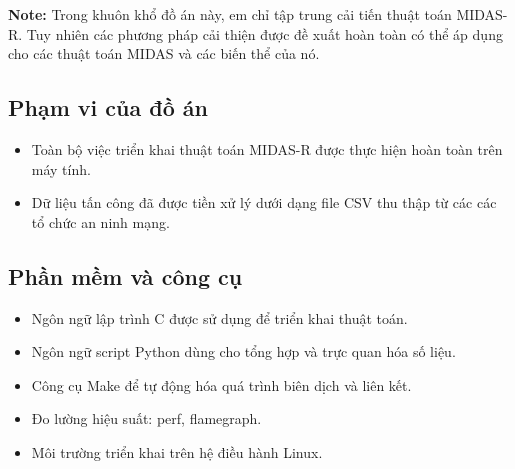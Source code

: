 \begin{tcolorbox}
    \textbf{Note:} Trong khuôn khổ đồ án này, em chỉ tập trung cải tiến thuật toán MIDAS-R.
    Tuy nhiên các phương pháp cải thiện được đề xuất hoàn toàn có thể áp dụng cho các thuật toán MIDAS
    và các biến thể của nó.
\end{tcolorbox}

\subsection{Phạm vi của đồ án}
\begin{itemize}
    \item  Toàn bộ việc triển khai thuật toán MIDAS-R được thực hiện hoàn toàn trên máy tính.
    \item Dữ liệu tấn công đã được tiền xử lý dưới dạng file CSV thu thập từ các
          các tổ chức an ninh mạng.
\end{itemize}

\subsection{Phần mềm và công cụ}

\begin{itemize}
    \item Ngôn ngữ lập trình C được sử dụng để triển khai thuật toán.
    \item Ngôn ngữ script Python dùng cho tổng hợp và trực quan hóa số liệu.
    \item Công cụ Make để tự động hóa quá trình biên dịch và liên kết.
    \item Đo lường hiệu suất: perf, flamegraph.
    \item Môi trường triển khai trên hệ điều hành Linux.
\end{itemize}